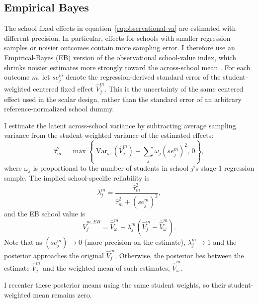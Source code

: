 \documentclass[a4paper, article, english, oneside, unknownkeysallowed, 12pt]{memoir}
\begin{document}
\subsection{Empirical Bayes}

The school fixed effects in equation~\eqref{eq:observational-va} are estimated with different precision.
In particular, effects for schools with smaller regression samples or noisier outcomes contain more sampling error.
I therefore use an Empirical-Bayes (EB) version of the observational school-value index, which shrinks noisier estimates more strongly toward the across-school mean \parencite{walters_chapter_2024}.
For each outcome $m$, let $se_j^m$ denote the regression-derived standard error of the student-weighted centered fixed effect $\widehat{V}_j^m$.
This is the uncertainty of the same centered effect used in the scalar design, rather than the standard error of an arbitrary reference-normalized school dummy.

I estimate the latent across-school variance by subtracting average sampling variance from the student-weighted variance of the estimated effects:
\begin{equation}
  \widehat{\tau}_m^2 =
  \max\left\{
    \operatorname{Var}_{\omega}\left(\widehat{V}_j^m\right)
    - \sum_j \omega_j (se_j^m)^2,\,
    0
  \right\},
  \label{eq:eb-latent-variance}
\end{equation}
where $\omega_j$ is proportional to the number of students in school $j$'s stage-1 regression sample.
The implied school-specific reliability is
\begin{equation}
  \lambda_j^m =
  \frac{\widehat{\tau}_m^2}
  {\widehat{\tau}_m^2 + (se_j^m)^2},
  \label{eq:eb-reliability}
\end{equation}
and the EB school value is
\begin{equation}
  \widehat{V}_{j}^{m,EB}
  =
  \overline{\widehat{V}}_{\omega}^m
  +
  \lambda_j^m
  \left(
    \widehat{V}_j^m-\overline{\widehat{V}}_{\omega}^m
  \right).
  \label{eq:eb-va}
\end{equation}
Note that as $(se_j^m) \to 0$ (more precision on the estimate), $\lambda^m_j \to 1$ and the posterior approaches the original $\hat{V}_j^m$.
Otherwise, the posterior lies between the estimate $\hat{V}_j^m$ and the weighted mean of such estimates, $\overline{\widehat{V}}_{\omega}^m$.

I recenter these posterior means using the same student weights, so their student-weighted mean remains zero.
\end{document}

